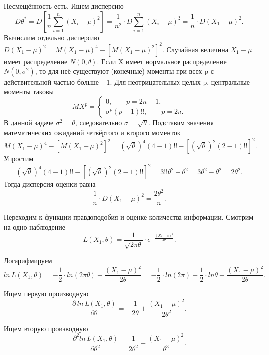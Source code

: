 Несмещённость есть.
Ищем дисперсию
$$D \theta^* =
  D \left[ \frac{1}{n} \sum \limits_{i = 1}^n \left( X_i - \mu \right)^2 \right] =
  \frac{1}{n^2} \cdot D \sum \limits_{i = 1}^n \left( X_i - \mu \right)^2 =
  \frac{1}{n} \cdot D \left( X_1 - \mu \right)^2.$$
Вычислим отдельно дисперсию
$D \left( X_1 - \mu \right)^2 =
  M \left( X_1 - \mu \right)^4 - \left[ M \left( X_1 - \mu \right)^2 \right]^2$.
Случайная величина $X_1 - \mu $ имеет распределение $N \left( 0, \theta \right) $.
Если X имеет нормальное распределение $N \left( 0, \sigma^2 \right) $,
то для неё существуют (конечные) моменты при всех p с действительной частью больше $-1$.
Для неотрицательных целых p, центральные моменты таковы
$$MX^p =
  \begin{cases}
    0, \qquad p = 2n + 1, \\
    \sigma^p \left( p - 1 \right)!!, \qquad p = 2n.
  \end{cases}$$
В данной задаче $ \sigma^2 = \theta $, следовательно $ \sigma = \sqrt{ \theta }$.
Подставим значения математических ожиданий четвёртого и второго моментов
$$M \left( X_1 - \mu \right)^4 - \left[ M \left( X_1 - \mu \right)^2 \right]^2 =
  \left( \sqrt{ \theta } \right)^4 \left( 4 - 1 \right)!! -
  \left[ \left( \sqrt{ \theta } \right)^2 \left( 2 - 1 \right)!! \right]^2.$$
Упростим
$$ \left( \sqrt{ \theta } \right)^4 \left( 4 - 1 \right)!! -
  \left[ \left( \sqrt{ \theta } \right)^2 \left( 2 - 1 \right)!! \right]^2 =
  3!! \theta^2 - \theta^2 =
  3 \theta^2 - \theta^2 =
  2 \theta^2.$$
Тогда дисперсия оценки равна
$$ \frac{1}{n} \cdot D \left( X_1 - \mu \right)^2 =
  \frac{2 \theta^2}{n}.$$

Переходим к функции правдоподобия и оценке количества информации.
Смотрим на одно наблюдение
$$L \left( X_1, \theta \right) =
  \frac{1}{ \sqrt{2 \pi \theta }} \cdot e^{- \frac{ \left( X_1 - \mu \right)^2}{2 \theta }}.$$

Логарифмируем
$$ln \, L \left( X_1, \theta \right) =
  - \frac{1}{2} \cdot ln \left( 2 \pi \theta \right) -
  \frac{ \left( X_1 - \mu \right)^2}{2 \theta } =
  - \frac{1}{2} \cdot ln \left( 2 \pi \right) - \frac{1}{2} \cdot ln \theta -
  \frac{ \left( X_1 - \mu \right)^2}{2 \theta }.$$

Ищем первую производную
$$ \frac{ \partial \, ln \, L \left( X_1, \theta \right) }{ \partial \theta } =
  - \frac{1}{2 \theta } + \frac{ \left( X_1 -  \mu \right)^2}{2 \theta^2}.$$

Ищем вторую производную
$$ \frac{ \partial^2 ln \, L \left( X_1, \theta \right) }{ \partial \theta^2} =
  \frac{1}{2 \theta^2} - \frac{ \left( X_1 - \mu \right)^2}{ \theta^3}.$$

